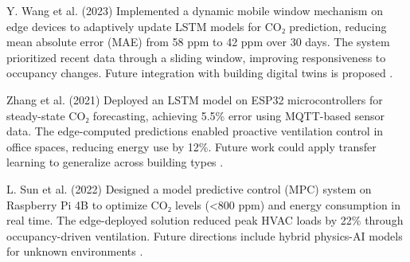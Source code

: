  Y. Wang et al. (2023)
Implemented a dynamic mobile window mechanism on edge devices to adaptively update LSTM models for CO₂ prediction, reducing mean absolute error (MAE) from 58 ppm to 42 ppm over 30 days. The system prioritized recent data through a sliding window, improving responsiveness to occupancy changes. Future integration with building digital twins is proposed \cite{23}.

 Zhang et al. (2021)
Deployed an LSTM model on ESP32 microcontrollers for steady-state CO₂ forecasting, achieving 5.5\% error using MQTT-based sensor data. The edge-computed predictions enabled proactive ventilation control in office spaces, reducing energy use by 12\%. Future work could apply transfer learning to generalize across building types \cite{24}.

 L. Sun et al. (2022)
Designed a model predictive control (MPC) system on Raspberry Pi 4B to optimize CO₂ levels (<800 ppm) and energy consumption in real time. The edge-deployed solution reduced peak HVAC loads by 22\% through occupancy-driven ventilation. Future directions include hybrid physics-AI models for unknown environments \cite{25}.
